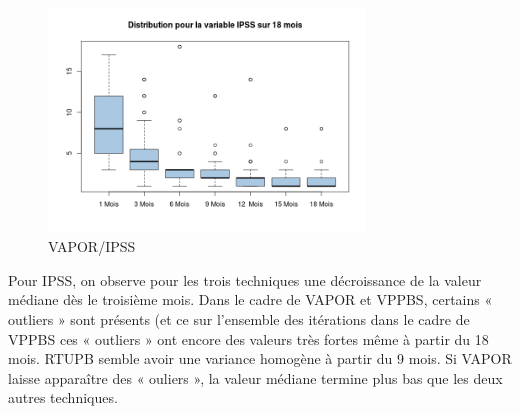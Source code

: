 \begin{figure}[H]
\centering
\includegraphics[width=0.75\textwidth]{../Fig/VAPOR/vapor-boxplot-post-ipss}
\caption{VAPOR/IPSS}
\end{figure}

%

Pour IPSS, on observe pour les trois techniques une décroissance de la valeur médiane dès le troisième mois. Dans le cadre de VAPOR et VPPBS, certains « outliers » sont présents (et ce sur l’ensemble des itérations dans le cadre de VPPBS ces « outliers » ont encore des valeurs très fortes même à partir du 18 mois.  RTUPB  semble avoir une variance homogène à partir du 9 mois. Si VAPOR laisse apparaître des « ouliers », la valeur médiane termine plus bas que les deux autres techniques. 

